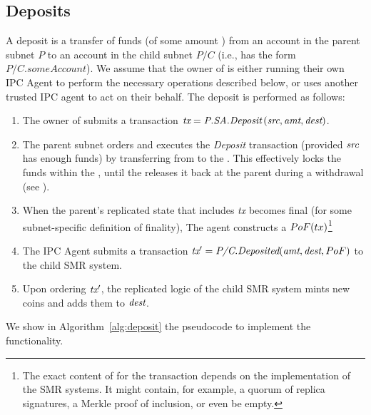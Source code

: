 \subsection{Deposits}
\label{sec:deposit}


A deposit is a transfer of funds (of some amount \fil) from an account \src in the parent subnet $P$ to an account \dest in the child subnet $P/C$ (i.e., \dest has the form $P/C.someAccount$).
We assume that the owner of \src is either running their own IPC Agent to perform the necessary operations described below, or uses another trusted IPC agent to act on their behalf.
The deposit is performed as follows:
\begin{enumerate}
    \item The owner of \src submits a transaction
    $\textit{tx}=\textit{P.\textit{SA}.Deposit}\left(\textit{src}, \textit{amt}, \textit{dest} \right)$.
    \item The parent subnet orders and executes the \emph{Deposit} transaction (provided $\textit{src}$ has enough funds) by transferring \fil from \src to the \sa. This effectively locks the funds within the \sa \actor, until the \sa \actor releases it back at the parent during a withdrawal (see ). 
    \item When the parent's replicated state that includes \emph{tx} becomes final (for some subnet-specific definition of finality),
    The \ipc agent constructs a $PoF(tx)$\footnote{The exact content of \prf for the transaction \tx depends on the implementation of the SMR systems. It might contain, for example, a quorum of replica signatures, a Merkle proof of inclusion, or even be empty.}
    \item The IPC Agent submits a transaction $\textit{tx}' = \textit{P/C.Deposited}(\textit{amt}, \textit{dest}, PoF)$ to the child SMR system.
    \item Upon ordering $\textit{tx}'$, the replicated logic of the child SMR system mints \fil new coins and adds them to $\textit{dest}$.
\end{enumerate}

We show in Algorithm~\ref{alg:deposit} the pseudocode to implement the functionality. 

